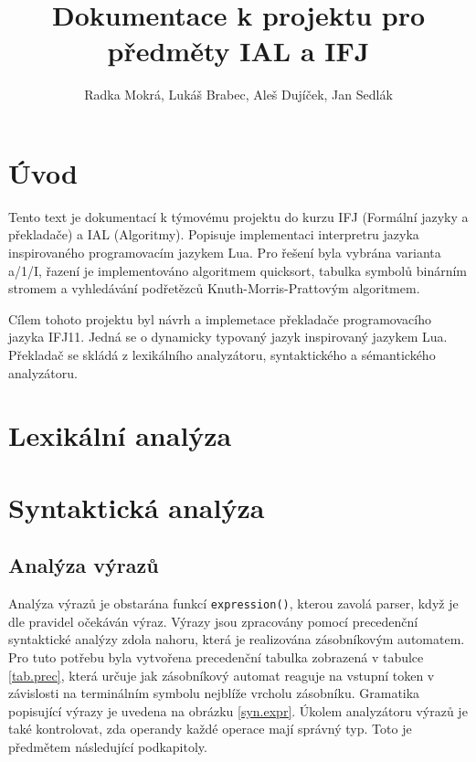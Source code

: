 \documentclass[a4paper,11pt,titlepage]{article}
\author{Radka Mokrá, Lukáš Brabec, Aleš Dujíček, Jan Sedlák}
\title{Dokumentace k projektu pro předměty IAL a IFJ}
\begin{document}


\tableofcontents

\newpage

\section{Úvod}
Tento text je dokumentací k týmovému projektu do kurzu IFJ (Formální jazyky a překladače) a IAL (Algoritmy). Popisuje implementaci interpretru jazyka inspirovaného programovacím jazykem Lua. Pro řešení byla vybrána varianta a/1/I, řazení je implementováno algoritmem quicksort, tabulka symbolů binárním stromem a vyhledávání podřetězců Knuth-Morris-Prat\-to\-vým algoritmem.

Cílem tohoto projektu byl návrh a implemetace překladače pro\-gra\-mo\-va\-cí\-ho jazyka IFJ11. Jedná se o dynamicky typovaný jazyk inspirovaný jazykem Lua. Překladač se skládá z lexikálního analyzátoru, syntaktického a sé\-man\-tic\-ké\-ho analyzátoru.

\section{Lexikální analýza}


\section{Syntaktická analýza}



\subsection{Analýza výrazů}
Analýza výrazů je obstarána funkcí {\tt expression()}, kterou zavolá parser, když je dle pravidel očekáván výraz. Výrazy jsou zpracovány pomocí precedenční syntaktické analýzy zdola nahoru, která je realizována zásobníkovým automatem. Pro tuto potřebu byla vytvořena precedenční tabulka zobrazená v tabulce \ref{tab.prec}, která určuje jak zásobníkový automat reaguje na vstupní token v závislosti na terminálním symbolu nejblíže vrcholu zásobníku. Gramatika popisující výrazy je uvedena na obrázku \ref{syn.expr}.
Úkolem analyzátoru výrazů je také kontrolovat, zda operandy každé operace mají správný typ. Toto je předmětem následující podkapitoly.
\end{document}
